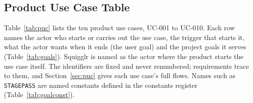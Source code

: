 \documentclass[12pt]{article}
\renewcommand{\_}{\textunderscore\allowbreak}%
\begin{document}
\subsection{Product Use Case Table}
\label{sec:puc-table}

Table~\ref{tab:puc} lists the ten product use cases, UC-001 to UC-010. Each row
names the actor who starts or carries out the use case, the trigger that starts
it, what the actor wants when it ends (the user goal) and the project goals it
serves (Table~\ref{tab:goals}). Squigglr is named as the actor where the product
starts the use case itself. The identifiers are fixed and never renumbered;
requirements trace to them, and Section~\ref{sec:puc} gives each use case's full
flows. Names such as \texttt{STAGE\_PASS} are named constants defined in the
constants register (Table~\ref{tab:goalconst}).
\end{document}
